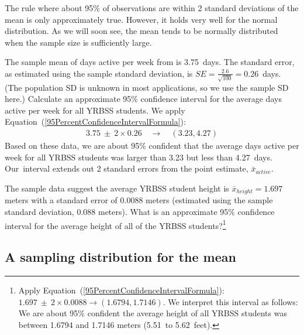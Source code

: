 The rule where about 95\% of observations are within 2 standard deviations of the mean is only approximately true. However, it holds very well for the normal distribution. As we will soon see, the mean tends to be normally distributed when the sample size is sufficiently large. 

\begin{example}{The sample mean of days active per week from  is 3.75~days. The standard error, as estimated using the sample standard deviation, is $SE=\frac{2.6}{\sqrt{100}} = 0.26$~days. (The population SD is unknown in most applications, so we use the sample SD here.) Calculate an approximate 95\% confidence interval for the average days active per week for all YRBSS students.}
We apply Equation~(\ref{95PercentConfidenceIntervalFormula}):
\begin{eqnarray*}
3.75\ \pm\ 2 \times  0.26 \quad \rightarrow \quad (3.23, 4.27)
\end{eqnarray*}
Based on these data, we are about 95\% confident that the average days active per week for all YRBSS students was larger than 3.23 but less than 4.27~days. Our~interval extends out 2 standard errors from the point estimate, $\bar{x}_{active}$.
\end{example}

\begin{exercise} \label{95CIExerciseForAgeOfYrbssSamp1}
The sample data suggest the average YRBSS student height is $\bar{x}_{height} = 1.697$ meters with a standard error of 0.0088 meters (estimated using the sample standard deviation, 0.088 meters). What is an approximate 95\% confidence interval for the average height of all of the YRBSS students?\footnote{Apply Equation~(\ref{95PercentConfidenceIntervalFormula}): $1.697 \ \pm \ 2\times 0.0088 \rightarrow (1.6794, 1.7146)$. We interpret this interval as follows: We are about 95\% confident the average height of all YRBSS students was between 1.6794 and 1.7146 meters (5.51~to 5.62~feet).}
\end{exercise}

\subsection{A sampling distribution for the mean}

